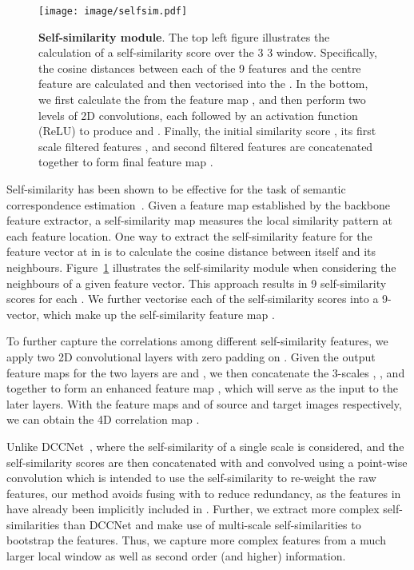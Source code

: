 \documentclass[10pt,twocolumn,letterpaper]{article}
\begin{document}
\begin{figure}[t]
\centering
  \texttt{[image: image/selfsim.pdf]}
\caption{\textbf{Self-similarity module}. The top left figure illustrates the calculation of a self-similarity score over the 3  3 window. Specifically, the cosine distances between each of the 9 features and the centre feature are calculated and then vectorised into the . In the bottom, we first calculate the  from the feature map , and then perform two levels of 2D convolutions, each followed by an activation function (ReLU) to produce  and . Finally, the initial similarity score , its first scale filtered features  , and second filtered features   are concatenated together to form final feature map .}
\label{fig:pss}
\end{figure}

Self-similarity has been shown to be effective for the task of semantic correspondence estimation~\cite{Kim_CVPR17_FCSS, Huang_ICCV19_DCCNet}. 
Given a feature map  established by the backbone feature extractor, a self-similarity map measures the local similarity pattern at each feature location.
One way to extract the self-similarity feature for the feature vector  at  in  is to calculate the cosine distance between itself and its neighbours.
Figure~\ref{fig:pss} illustrates the self-similarity module when considering the  neighbours of a given feature vector.
This approach results in 9 self-similarity scores for each .
We further vectorise each of the  self-similarity scores into a 9-vector, which make up the self-similarity feature map .

To further capture the correlations among different self-similarity features,
we apply two 2D convolutional layers with zero padding on .
Given the output feature maps for the two layers are  and , we then concatenate the 3-scales , , and  together to form an enhanced feature map , which will serve as the input to the later layers.
With the feature maps  and  of source and target images respectively, we can obtain the 4D correlation map . 



Unlike DCCNet~\cite{Huang_ICCV19_DCCNet}, where the self-similarity of a single scale is considered, and the self-similarity scores are then concatenated with  and convolved using a point-wise convolution which is intended to use the self-similarity to re-weight the raw features, our method avoids fusing with  to reduce redundancy, as the features in  have already been implicitly included in .
Further, we extract more complex self-similarities than DCCNet and make use of multi-scale self-similarities to bootstrap the features.
Thus, we capture more complex features from a much larger local window as well as second order (and higher) information.
\end{document}

